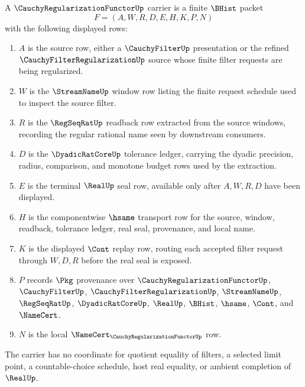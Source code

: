 \begin{definition}
\label{def:cauchy-regularization-functor-carrier}
A $\CauchyRegularizationFunctorUp$ carrier is a finite $\BHist$ packet
$$
F=(A,W,R,D,E,H,K,P,N)
$$
with the following displayed rows:
\begin{enumerate}
\item $A$ is the source row, either a $\CauchyFilterUp$ presentation or the refined $\CauchyFilterRegularizationUp$ source whose finite filter requests are being regularized.
\item $W$ is the $\StreamNameUp$ window row listing the finite request schedule used to inspect the source filter.
\item $R$ is the $\RegSeqRatUp$ readback row extracted from the source windows, recording the regular rational name seen by downstream consumers.
\item $D$ is the $\DyadicRatCoreUp$ tolerance ledger, carrying the dyadic precision, radius, comparison, and monotone budget rows used by the extraction.
\item $E$ is the terminal $\RealUp$ seal row, available only after $A,W,R,D$ have been displayed.
\item $H$ is the componentwise $\hsame$ transport row for the source, window, readback, tolerance ledger, real seal, provenance, and local name.
\item $K$ is the displayed $\Cont$ replay row, routing each accepted filter request through $W,D,R$ before the real seal is exposed.
\item $P$ records $\Pkg$ provenance over $\CauchyRegularizationFunctorUp$, $\CauchyFilterUp$, $\CauchyFilterRegularizationUp$, $\StreamNameUp$, $\RegSeqRatUp$, $\DyadicRatCoreUp$, $\RealUp$, $\BHist$, $\hsame$, $\Cont$, and $\NameCert$.
\item $N$ is the local $\NameCert_{\CauchyRegularizationFunctorUp}$ row.
\end{enumerate}
The carrier has no coordinate for quotient equality of filters, a selected limit point, a countable-choice schedule, host real equality, or ambient completion of $\RealUp$.
\end{definition}


